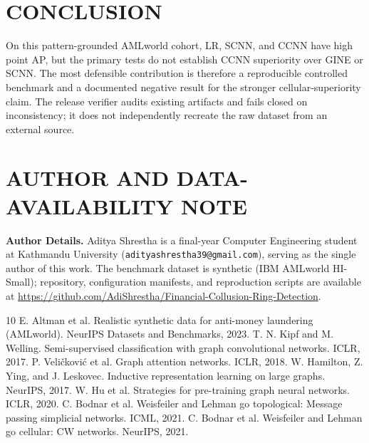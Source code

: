 \documentclass[12pt,a4paper]{article}
\begin{document}
\section{CONCLUSION}
On this pattern-grounded AMLworld cohort, LR, SCNN, and CCNN have high point AP, but the primary tests do not establish CCNN superiority over GINE or SCNN. The most defensible contribution is therefore a reproducible controlled benchmark and a documented negative result for the stronger cellular-superiority claim. The release verifier audits existing artifacts and fails closed on inconsistency; it does not independently recreate the raw dataset from an external source.

\section*{AUTHOR AND DATA-AVAILABILITY NOTE}
\textbf{Author Details.} Aditya Shrestha is a final-year Computer Engineering student at Kathmandu University (\texttt{adityashrestha39@gmail.com}), serving as the single author of this work. The benchmark dataset is synthetic (IBM AMLworld HI-Small); repository, configuration manifests, and reproduction scripts are available at \url{https://github.com/AdiShrestha/Financial-Collusion-Ring-Detection}.


\begin{thebibliography}{10}
 E. Altman et al. Realistic synthetic data for anti-money laundering (AMLworld). NeurIPS Datasets and Benchmarks, 2023.
 T. N. Kipf and M. Welling. Semi-supervised classification with graph convolutional networks. ICLR, 2017.
 P. Veli\v{c}kovi\'c et al. Graph attention networks. ICLR, 2018.
 W. Hamilton, Z. Ying, and J. Leskovec. Inductive representation learning on large graphs. NeurIPS, 2017.
 W. Hu et al. Strategies for pre-training graph neural networks. ICLR, 2020.
 C. Bodnar et al. Weisfeiler and Lehman go topological: Message passing simplicial networks. ICML, 2021.
 C. Bodnar et al. Weisfeiler and Lehman go cellular: CW networks. NeurIPS, 2021.
\end{thebibliography}
\end{document}
